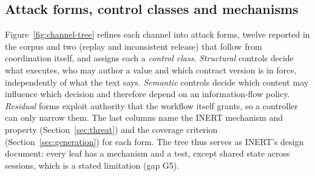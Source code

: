 \documentclass[pdflatex,sn-mathphys-num]{sn-jnl}
\theoremstyle{thmstyleone}%
\theoremstyle{thmstyletwo}%
\theoremstyle{thmstylethree}%
\begin{document}
\subsection{Attack forms, control classes and mechanisms}\label{sec:tax-tree}

Figure~\ref{fig:channel-tree} refines each channel into attack forms, twelve reported in the corpus and two (replay and inconsistent release) that follow from coordination itself, and assigns each a \emph{control class}. \emph{Structural} controls decide what executes, who may author a value and which contract version is in force, independently of what the text says. \emph{Semantic} controls decide which content may influence which decision and therefore depend on an information-flow policy. \emph{Residual} forms exploit authority that the workflow itself grants, so a controller can only narrow them. The last columns name the INERT mechanism and property (Section~\ref{sec:threat}) and the coverage criterion (Section~\ref{sec:generation}) for each form. The tree thus serves as INERT's design document: every leaf has a mechanism and a test, except shared state across sessions, which is a stated limitation (gap G5).
\end{document}
